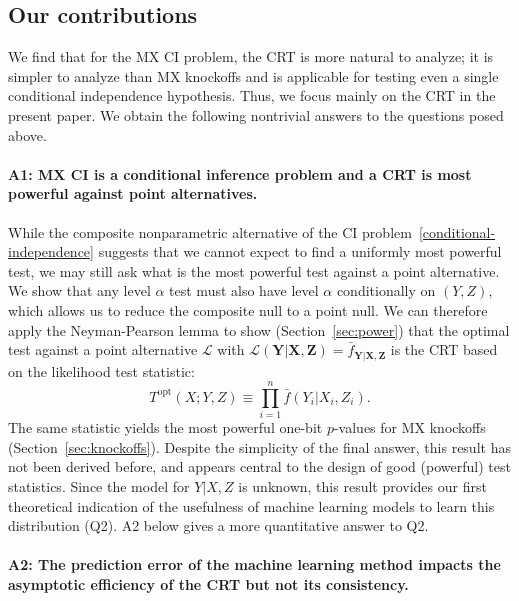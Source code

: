 \documentclass[12pt]{article}
\theoremstyle{definition}
\theoremstyle{remark}
\newcommand{\prx}{\bm X}
\newcommand{\srx}{X}
\newcommand{\prz}{\bm Z}
\newcommand{\srz}{Z}
\newcommand{\pry}{{\bm Y}}
\newcommand{\sry}{Y}
\begin{document}
\subsection{Our contributions}



We find that for the MX CI problem, the CRT is more natural to analyze; it is simpler to analyze than MX knockoffs and is applicable for testing even a single conditional independence hypothesis. Thus, we focus mainly on the CRT in the present paper. We obtain the following nontrivial answers to the questions posed above.

\paragraph{A1: MX CI is a conditional inference problem and a CRT is most powerful against point alternatives.}

While the composite nonparametric alternative of the CI problem~\eqref{conditional-independence} suggests that we cannot expect to find a uniformly most powerful test, we may still ask what is the most powerful test against a point alternative. We show that any level $\alpha$ test must also have level $\alpha$ conditionally on $(\sry, \srz)$, which allows us to reduce the composite null to a point null. We can therefore apply the Neyman-Pearson lemma to show (Section~\ref{sec:power}) that the optimal test against a point alternative $\mathcal L$ with $\mathcal L(\pry|\prx,\prz) = \bar f_{\pry|\prx,\prz}$ is the CRT based on the likelihood test statistic:
\begin{equation}
	T^{\text{opt}}(\srx; \sry, \srz) \equiv \prod_{i = 1}^n \bar f(\sry_i|\srx_i, \srz_i).
\end{equation}
The same statistic yields the most powerful one-bit $p$-values for MX knockoffs (Section~\ref{sec:knockoffs}). Despite the simplicity of the final answer, this result has not been derived before, and appears central to the design of good (powerful) test statistics. Since the model for $Y|X,Z$ is unknown, this result provides our first theoretical indication of the usefulness of machine learning models to learn this distribution (Q2). A2 below gives a more quantitative answer to Q2.

\paragraph{A2: The prediction error of the machine learning method impacts the asymptotic efficiency of the CRT but not its consistency.}
\end{document}
